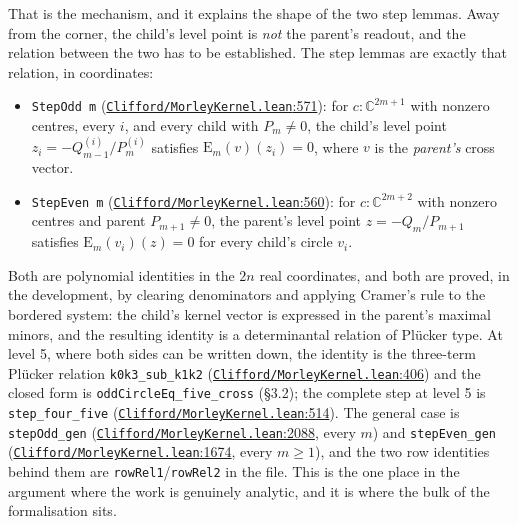 \documentclass[11pt]{article}
\providecommand{\tightlist}{\setlength{\itemsep}{0pt}\setlength{\parskip}{0pt}}
\theoremstyle{definition}
\theoremstyle{remark}
\begin{document}
That is the mechanism, and it explains the shape of the two step lemmas. Away from the corner, the child's
level point is \emph{not} the parent's readout, and the relation between the two has to be established. The
step lemmas are exactly that relation, in coordinates:

\begin{itemize}
\tightlist
\item
  \texttt{StepOdd\ m} (\href{https://github.com/jpbald93/paperl_clifford_chain/blob/e1ae145c2565cc98816635387412edc0a740c27c/Clifford/MorleyKernel.lean\#L571}{\texttt{Clifford/\allowbreak MorleyKernel.lean}:571}): for \(c : \mathbb{C}^{2m+1}\) with nonzero centres, every
  \(i\), and every child with \(P_m \ne 0\), the child's level point \(z_i = -Q^{(i)}_{m-1}/P^{(i)}_m\)
  satisfies \(\mathrm{E}_m(v)(z_i) = 0\), where \(v\) is the \emph{parent's} cross vector.
\item
  \texttt{StepEven\ m} (\href{https://github.com/jpbald93/paperl_clifford_chain/blob/e1ae145c2565cc98816635387412edc0a740c27c/Clifford/MorleyKernel.lean\#L560}{\texttt{Clifford/\allowbreak MorleyKernel.lean}:560}): for \(c : \mathbb{C}^{2m+2}\) with nonzero centres and
  parent \(P_{m+1} \ne 0\), the parent's level point \(z = -Q_m/P_{m+1}\) satisfies
  \(\mathrm{E}_m(v_i)(z) = 0\) for every child's circle \(v_i\).
\end{itemize}

Both are polynomial identities in the \(2n\) real coordinates, and both are proved, in the development, by
clearing denominators and applying Cramer's rule to the bordered system: the child's kernel vector is
expressed in the parent's maximal minors, and the resulting identity is a determinantal relation of
Plücker type. At level 5, where both sides can be written down, the identity is the three-term Plücker
relation \texttt{k0k3\_\allowbreak sub\_\allowbreak k1k2} (\href{https://github.com/jpbald93/paperl_clifford_chain/blob/e1ae145c2565cc98816635387412edc0a740c27c/Clifford/MorleyKernel.lean\#L406}{\texttt{Clifford/\allowbreak MorleyKernel.lean}:406}) and the closed form is
\texttt{oddCircleEq\_\allowbreak five\_\allowbreak cross} (\S{}3.2); the complete step at level 5 is \texttt{step\_\allowbreak four\_\allowbreak five}
(\href{https://github.com/jpbald93/paperl_clifford_chain/blob/e1ae145c2565cc98816635387412edc0a740c27c/Clifford/MorleyKernel.lean\#L514}{\texttt{Clifford/\allowbreak MorleyKernel.lean}:514}). The general case is \texttt{stepOdd\_\allowbreak gen}
(\href{https://github.com/jpbald93/paperl_clifford_chain/blob/e1ae145c2565cc98816635387412edc0a740c27c/Clifford/MorleyKernel.lean\#L2088}{\texttt{Clifford/\allowbreak MorleyKernel.lean}:2088}, every \(m\)) and \texttt{stepEven\_\allowbreak gen} (\href{https://github.com/jpbald93/paperl_clifford_chain/blob/e1ae145c2565cc98816635387412edc0a740c27c/Clifford/MorleyKernel.lean\#L1674}{\texttt{Clifford/\allowbreak MorleyKernel.lean}:1674},
every \(m \ge 1\)), and the two row identities behind them are \texttt{rowRel1}/\texttt{rowRel2} in the file. This is the
one place in the argument where the work is genuinely analytic, and it is where the bulk of the
formalisation sits.
\end{document}
